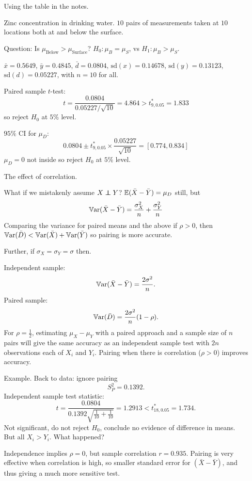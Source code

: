 \documentclass[10pt, a4paper]{article}
\begin{document}
\begin{example}
    Using the table in the notes.

    Zinc concentration in drinking water.
    $10$ pairs of measurements taken at $10$ locations both at and below the surface.

    Question:
    Is $\mu_{\text{Below}} > \mu_{\text{Surface}}$?
    $H_0 : \mu_{B} = \mu_{S}$,
    vs $H_1 : \mu_{B} > \mu_{S}$.

    $\bar{x} = 0.5649$,
    $\bar{y} = 0.4845$,
    $\bar{d} = 0.0804$,
    $\mathrm{sd}(x) = 0.14678$,
    $\mathrm{sd}(y) = 0.13123$,
    $\mathrm{sd}(d) = 0.05227$,
    with $n = 10$ for all.

    Paired sample $t$-test:
    \[
    t = \frac{0.0804}{0.05227 / \sqrt{10}} = 4.864 > t_{9, 0.05}^{*} = 1.833
    \]
    so reject $H_0$ at $5\%$ level.

    $95\%$ CI for $\mu_{D}$:
    \[
    0.0804 \pm t_{9, 0.05}^{*}\times\frac{0.05227}{\sqrt{10}} = [0.774, 0.834]
    \]
    $\mu_{D} = 0$ not inside so reject $H_0$ at $5\%$ level.
\end{example}

The effect of correlation.

What if we mistakenly assume $X \independent Y$?
$\mathbb{E}(\bar{X} - \bar{Y}) = \mu_{D}$ still,
but
\[
\mathbb{V}\mathrm{ar}(\bar{X} - \bar{Y}) = \frac{\sigma_{X} ^ 2}{n} + \frac{\sigma_{Y} ^ 2}{n}
\]
Comparing the variance for paired means and the above if $\rho > 0$,
then $\mathbb{V}\mathrm{ar}(\bar{D}) < \mathbb{V}\mathrm{ar}(\bar{X}) + \mathbb{V}\mathrm{ar}(\bar{Y})$ so pairing is more accurate.

Further,
if $\sigma_{X} = \sigma_{Y} = \sigma$ then.

Independent sample:
\[
\mathbb{V}\mathrm{ar}(\bar{X} - \bar{Y}) = \frac{2\sigma ^ 2}{n}.
\]
Paired sample:
\[
\mathbb{V}\mathrm{ar}(\bar{D}) = \frac{2\sigma ^ 2}{n}(1 - \rho).
\]
For $\rho = \frac{1}{2}$,
estimating $\mu_{X} - \mu_{Y}$ with a paired approach and a sample size of $n$ pairs will give the same accuracy as an independent sample test with $2n$ observations each of $X_i$ and $Y_i$.
Pairing when there is correlation
($\rho > 0$)
improves accuracy.

Example.
Back to data:
ignore pairing
\[
S_{P} ^ 2 = 0.1392.
\]
Independent sample test statistic:
\[
t = \frac{0.0804}{0.1392\sqrt{\frac{1}{10} + \frac{1}{10}}} = 1.2913 < t_{18, 0.05}^{*} = 1.734.
\]
Not significant,
do not reject $H_0$,
conclude no evidence of difference in means.
But all $X_i > Y_i$.
What happened?

Independence implies $\rho = 0$,
but sample correlation $r = 0.935$.
Pairing is very effective when correlation is high,
so smaller standard error for $(\bar{X} - \bar{Y})$,
and thus giving a much more sensitive test.
\end{document}
